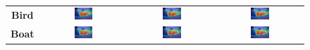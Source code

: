 \begin{figure}[ht]
\begin{tabular}{c c c c}
    \textbf{Bird}        & \includegraphics[width=0.23\textwidth]{figures/qualitative_analysis/test_cam/2010_005860_6.jpg} & \includegraphics[width=0.23\textwidth]{figures/qualitative_analysis/test_cam/2010_005860_6.jpg} & \includegraphics[width=0.23\textwidth]{figures/qualitative_analysis/test_cam/2010_005860_6.jpg} \\
    \textbf{Boat}        & \includegraphics[width=0.23\textwidth]{figures/qualitative_analysis/test_cam/2010_005860_6.jpg} & \includegraphics[width=0.23\textwidth]{figures/qualitative_analysis/test_cam/2010_005860_6.jpg} & \includegraphics[width=0.23\textwidth]{figures/qualitative_analysis/test_cam/2010_005860_6.jpg} \\

\end{tabular}
\end{figure}

